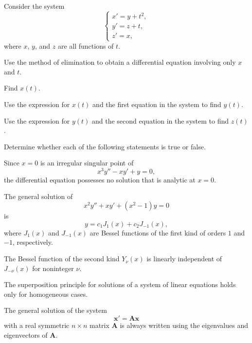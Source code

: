 \documentclass[11pt,oneside]{article}
\begin{document}
\begin{problem}
Consider the system
\[
\begin{cases}
x'=y+t^2,\\
y'=z+t,\\
z'=x,
\end{cases}
\]
where $x$, $y$, and $z$ are all functions of $t$.
\begin{problemsubparts}
\item Use the method of elimination to obtain a differential equation involving only $x$ and $t$.
\item Find $x(t)$.
\item Use the expression for $x(t)$ and the first equation in the system to find $y(t)$.
\item Use the expression for $y(t)$ and the second equation in the system to find $z(t)$.
\end{problemsubparts}
\end{problem}

\begin{problem}
Determine whether each of the following statements is true or false.
\begin{problemchoices}
\item Since $x=0$ is an irregular singular point of
\[
x^3y''-xy'+y=0,
\]
the differential equation possesses no solution that is analytic at $x=0$.
\item The general solution of
\[
x^2y''+xy'+(x^2-1)y=0
\]
is
\[
y=c_1J_1(x)+c_2J_{-1}(x),
\]
where $J_1(x)$ and $J_{-1}(x)$ are Bessel functions of the first kind of orders $1$ and $-1$, respectively.
\item The Bessel function of the second kind $Y_\nu(x)$ is linearly independent of $J_{-\nu}(x)$ for noninteger $\nu$.
\item The superposition principle for solutions of a system of linear equations holds only for homogeneous cases.
\item The general solution of the system
\[
\mathbf x'=\mathbf A\mathbf x
\]
with a real symmetric $n\times n$ matrix $\mathbf A$ is always written using the eigenvalues and eigenvectors of $\mathbf A$.
\end{problemchoices}
\end{problem}
\end{document}
